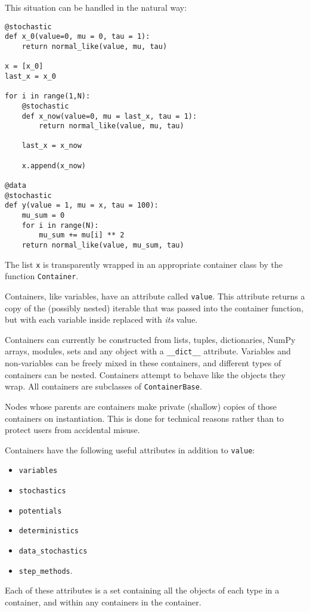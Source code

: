 This situation can be handled in the natural way:
\begin{verbatim}
@stochastic
def x_0(value=0, mu = 0, tau = 1):
    return normal_like(value, mu, tau)

x = [x_0]
last_x = x_0

for i in range(1,N):          
    @stochastic
    def x_now(value=0, mu = last_x, tau = 1):
        return normal_like(value, mu, tau)
        
    last_x = x_now
    
    x.append(x_now)

@data
@stochastic
def y(value = 1, mu = x, tau = 100):
    mu_sum = 0
    for i in range(N):
        mu_sum += mu[i] ** 2
    return normal_like(value, mu_sum, tau)
\end{verbatim}
The list \texttt{x} is transparently wrapped in an appropriate container class by the function \texttt{Container}.

Containers, like variables, have an attribute called \texttt{value}. This attribute returns a copy of the (possibly nested) iterable that was passed into the container function, but with each variable inside replaced with \emph{its} value. 

Containers can currently be constructed from lists, tuples, dictionaries, NumPy arrays, modules, sets and any object with a \texttt{__dict__} attribute. Variables and non-variables can be freely mixed in these containers, and different types of containers can be nested. Containers attempt to behave like the objects they wrap. All containers are subclasses of \texttt{ContainerBase}. 

Nodes whose parents are containers make private (shallow) copies of those containers on instantiation. This is done for technical reasons rather than to protect users from accidental misuse.

Containers have the following useful attributes in addition to \texttt{value}:
\begin{itemize}
    \item\texttt{variables}
    \item\texttt{stochastics}
    \item\texttt{potentials}
    \item\texttt{deterministics}
    \item\texttt{data_stochastics}
    \item\texttt{step_methods}.
\end{itemize}
Each of these attributes is a set containing all the objects of each type in a container, and within any containers in the container.

